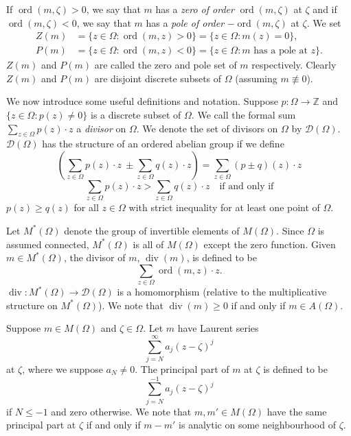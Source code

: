 If $\operatorname{ord}(m,\zeta)>0$, we say that $m$ has a \emph{zero of order} $\operatorname{ord}(m,\zeta)$ at $\zeta$ and if $\operatorname{ord}(m,\zeta)<0$, we say that $m$ has a \emph{pole of order} $-\operatorname{ord}(m,\zeta)$ at $\zeta$. We set
\begin{align*}
Z(m)&=\{z\in\Omega:\operatorname{ord}(m,z)>0\}=\{z\in\Omega:m(z)=0\},\\
P(m)&=\{z\in\Omega:\operatorname{ord}(m,z)<0\}=\{z\in\Omega:m\text{ has a pole at }z\}.
\end{align*}
$Z(m)$ and $P(m)$ are called the zero and pole set of $m$ respectively. Clearly $Z(m)$ and $P(m)$ are disjoint discrete subsets of $\Omega$ (assuming $m\not\equiv0$).

We now introduce some useful definitions and notation. Suppose $p:\Omega\to\mathbb Z$ and $\{z\in\Omega:p(z)\ne0\}$ is a discrete subset of $\Omega$. We call the formal sum $\sum_{z\in\Omega}p(z)\cdot z$ a \emph{divisor} on $\Omega$. We denote the set of divisors on $\Omega$ by $\mathcal D(\Omega)$. $\mathcal D(\Omega)$ has the structure of an ordered abelian group if we define
\[ \left(\sum_{z\in\Omega}p(z)\cdot z\ \pm\sum_{z\in\Omega}q(z)\cdot z\right)=\sum_{z\in\Omega}(p\pm q)(z)\cdot z \]
\[ \sum_{z\in\Omega}p(z)\cdot z>\sum_{z\in\Omega}q(z)\cdot z\quad\text{if and only if} \]
$p(z)\geq q(z)$ for all $z\in\Omega$ with strict inequality for at least one point of $\Omega$.

Let $M^*(\Omega)$ denote the group of invertible elements of $M(\Omega)$. Since $\Omega$ is assumed connected, $M^*(\Omega)$ is all of $M(\Omega)$ except the zero function. Given $m\in M^*(\Omega)$, the divisor of $m$, $\operatorname{div}(m)$, is defined to be
\[ \sum_{z\in\Omega}\operatorname{ord}(m,z)\cdot z. \]
$\operatorname{div}:M^*(\Omega)\to\mathcal D(\Omega)$ is a homomorphism (relative to the multiplicative structure on $M^*(\Omega)$). We note that $\operatorname{div}(m)\geq0$ if and only if $m\in A(\Omega)$.

Suppose $m\in M(\Omega)$ and $\zeta\in\Omega$. Let $m$ have Laurent series
\[ \sum_{j=N}^{\infty}a_j(z-\zeta)^j \]
at $\zeta$, where we suppose $a_N\ne0$. The principal part of $m$ at $\zeta$ is defined to be
\[ \sum_{j=N}^{-1}a_j(z-\zeta)^j \]
if $N\leq-1$ and zero otherwise. We note that $m,m'\in M(\Omega)$ have the same principal part at $\zeta$ if and only if $m-m'$ is analytic on some neighbourhood of $\zeta$.

